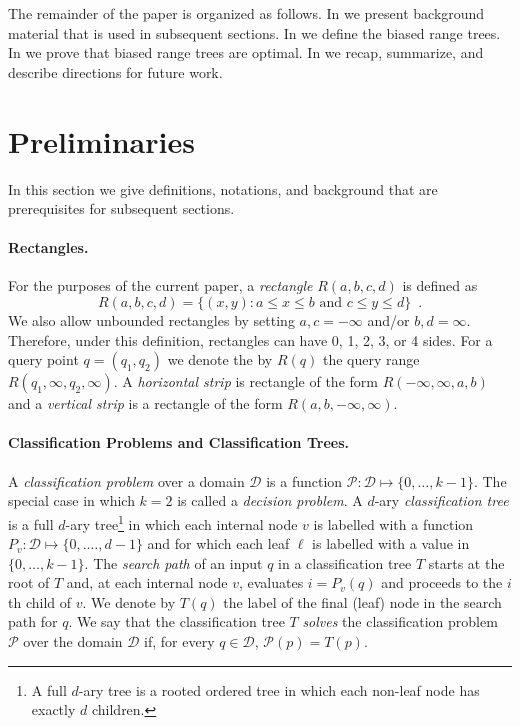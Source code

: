 \documentclass[lotsofwhite,charterfonts]{patmorin}
\begin{document}
The remainder of the paper is organized as follows. In
 we present background material that is used in
subsequent sections.  In  we define the biased
range trees. In  we prove that biased range trees
are optimal.  In  we recap, summarize, and describe
directions for future work.

\section{Preliminaries}


In this section we give definitions, notations, and background
that are prerequisites for subsequent sections.

\paragraph{Rectangles.}

For the purposes of the current paper, a \emph{rectangle}
$R(a,b,c,d)$ is defined as
\[
    R(a,b,c,d) = \{ (x,y) : \mbox{$a\le  x \le b$ and $c \le y \le d$}\}
	\enspace .
\]
We also allow unbounded rectangles by setting $a,c=-\infty$ and/or
$b,d=\infty$.  Therefore, under this definition, rectangles can have
0, 1, 2, 3, or 4 sides.  For a query point $q=(q_1,q_2)$ we denote the
by $R(q)$ the query range $R(q_1,\infty,q_2,\infty)$.  A
\emph{horizontal strip} is rectangle of the form
$R(-\infty,\infty,a,b)$ and a \emph{vertical strip} is a rectangle of
the form $R(a,b,-\infty,\infty)$.

\paragraph{Classification Problems and Classification Trees.}

A \emph{classification problem} over a domain $\mathcal{D}$ is a
function $\mathcal{P}:\mathcal{D}\mapsto \{0,\ldots,k-1\}$.  The
special case in which $k=2$ is called a \emph{decision problem}.  A
$d$-ary \emph{classification tree} is a full $d$-ary tree\footnote{A
full $d$-ary tree is a rooted ordered tree in which each non-leaf node
has exactly $d$ children.} in which each internal node $v$ is labelled
with a function $P_v:\mathcal{D}\mapsto\{0,.\ldots,d-1\}$ and for
which each leaf $\ell$ is labelled with a value
in $\{0,\ldots,k-1\}$. The \emph{search path} of an input $q$
in a classification tree $T$ starts at the root of $T$ and, at each
internal node $v$, evaluates $i=P_v(q)$ and proceeds to the $i$th
child of $v$.  We denote by $T(q)$ the label of the final (leaf) node
in the search path for $q$.  We say that the classification tree $T$
\emph{solves} the classification problem $\mathcal{P}$ over the domain
$\mathcal{D}$ if, for every $q\in \mathcal{D}$, $\mathcal{P}(p)=T(p)$.
\end{document}
